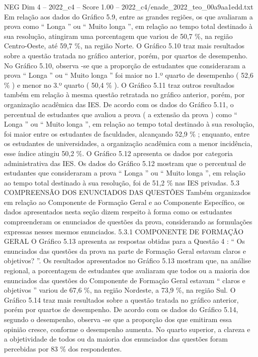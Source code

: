 \begin{textsample}{NEG Dim 4 – 2022\_c4 – Score 1.00 – 2022\_c4/enade\_2022\_teo\_00a9aa1edd.txt}
Em relação aos dados do Gráfico 5.9, entre as grandes regiões, os que avaliaram a prova como “ Longa ” ou “ Muito longa ”, em relação ao tempo total destinado à sua resolução, atingiram uma porcentagem que variou de 50,7 \%, na região Centro-Oeste, até 59,7 \%, na região Norte.
O Gráfico 5.10 traz mais resultados sobre a questão tratada no gráfico anterior, porém, por quartos de desempenho.
No Gráfico 5.10, observa -se que a proporção de estudantes que consideraram a prova “ Longa ” ou “ Muito longa ” foi maior no 1.º quarto de desempenho ( 52,6 \% ) e menor no 3.º quarto ( 50,4 \% ).
O Gráfico 5.11 traz outros resultados também em relação à mesma questão retratada no gráfico anterior, porém, por organização acadêmica das IES.
De acordo com os dados do Gráfico 5.11, o percentual de estudantes que avaliou a prova ( a extensão da prova ) como “ Longa ” ou “ Muito longa ”, em relação ao tempo total destinado à sua resolução, foi maior entre os estudantes de faculdades, alcançando 52,9 \% ; enquanto, entre os estudantes de universidades, a organização acadêmica com a menor incidência, esse índice atingiu 50,2 \%.
O Gráfico 5.12 apresenta os dados por categoria administrativa das IES.
Os dados do Gráfico 5.12 mostram que o percentual de estudantes que consideraram a prova “ Longa ” ou “ Muito longa ”, em relação ao tempo total destinado à sua resolução, foi de 51,2 \% nas IES privadas. 5.3 COMPREENSÃO DOS ENUNCIADOS DAS QUESTÕES Também organizados em relação ao Componente de Formação Geral e ao Componente Específico, os dados apresentados nesta seção dizem respeito à forma como os estudantes compreenderam os enunciados de questões da prova, considerando as formulações expressas nesses mesmos enunciados. 5.3.1 COMPONENTE DE FORMAÇÃO GERAL O Gráfico 5.13 apresenta as respostas obtidas para a Questão 4 : “ Os enunciados das questões da prova na parte de Formação Geral estavam claros e objetivos? ”.
Os resultados apresentados no Gráfico 5.13 mostram que, na análise regional, a porcentagem de estudantes que avaliaram que todos ou a maioria dos enunciados das questões do Componente de Formação Geral estavam “ claros e objetivos ” variou de 67,6 \%, na região Nordeste, a 73,9 \%, na região Sul.
O Gráfico 5.14 traz mais resultados sobre a questão tratada no gráfico anterior, porém por quartos de desempenho.
De acordo com os dados do Gráfico 5.14, segundo o desempenho, observa -se que a proporção dos que emitiram essa opinião cresce, conforme o desempenho aumenta.
No quarto superior, a clareza e a objetividade de todos ou da maioria dos enunciados das questões foram percebidas por 83 \% dos respondentes.

\end{textsample}
